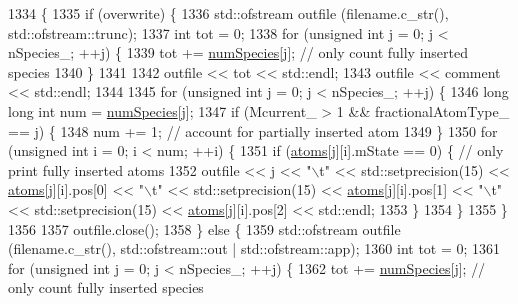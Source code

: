 \begin{DoxyCode}
1334                                                                                     \{
1335     \textcolor{keywordflow}{if} (overwrite) \{
1336         std::ofstream outfile (filename.c\_str(), std::ofstream::trunc);
1337         \textcolor{keywordtype}{int} tot = 0;
1338         \textcolor{keywordflow}{for} (\textcolor{keywordtype}{unsigned} \textcolor{keywordtype}{int} j = 0; j < nSpecies\_; ++j) \{
1339             tot += \hyperlink{classsim_system_a9eea865e6dc1cff377b1e79c4d9c23f0}{numSpecies}[j]; \textcolor{comment}{// only count fully inserted species}
1340         \}
1341 
1342         outfile << tot << std::endl;
1343         outfile << comment << std::endl;
1344 
1345         \textcolor{keywordflow}{for} (\textcolor{keywordtype}{unsigned} \textcolor{keywordtype}{int} j = 0; j < nSpecies\_; ++j) \{
1346             \textcolor{keywordtype}{long} \textcolor{keywordtype}{long} \textcolor{keywordtype}{int} num = \hyperlink{classsim_system_a9eea865e6dc1cff377b1e79c4d9c23f0}{numSpecies}[j];
1347             \textcolor{keywordflow}{if} (Mcurrent\_ > 1 && fractionalAtomType\_ == j) \{
1348                 num += 1; \textcolor{comment}{// account for partially inserted atom}
1349             \}
1350             \textcolor{keywordflow}{for} (\textcolor{keywordtype}{unsigned} \textcolor{keywordtype}{int} i = 0; i < num; ++i) \{
1351                 \textcolor{keywordflow}{if} (\hyperlink{classsim_system_a90421b19082f7fb8fc23b7264b1161e4}{atoms}[j][i].mState == 0) \{ \textcolor{comment}{// only print fully inserted atoms}
1352                     outfile << j << \textcolor{stringliteral}{"\(\backslash\)t"} <<  std::setprecision(15) << \hyperlink{classsim_system_a90421b19082f7fb8fc23b7264b1161e4}{atoms}[j][i].pos[0] << \textcolor{stringliteral}{"\(\backslash\)t"} << 
      std::setprecision(15) << \hyperlink{classsim_system_a90421b19082f7fb8fc23b7264b1161e4}{atoms}[j][i].pos[1] << \textcolor{stringliteral}{"\(\backslash\)t"} << std::setprecision(15) << 
      \hyperlink{classsim_system_a90421b19082f7fb8fc23b7264b1161e4}{atoms}[j][i].pos[2] << std::endl;
1353                 \}
1354             \}
1355         \}
1356 
1357         outfile.close();
1358     \} \textcolor{keywordflow}{else} \{
1359         std::ofstream outfile (filename.c\_str(), std::ofstream::out | std::ofstream::app);
1360         \textcolor{keywordtype}{int} tot = 0;
1361         \textcolor{keywordflow}{for} (\textcolor{keywordtype}{unsigned} \textcolor{keywordtype}{int} j = 0; j < nSpecies\_; ++j) \{
1362             tot += \hyperlink{classsim_system_a9eea865e6dc1cff377b1e79c4d9c23f0}{numSpecies}[j]; \textcolor{comment}{// only count fully inserted species}

\end{DoxyCode}
